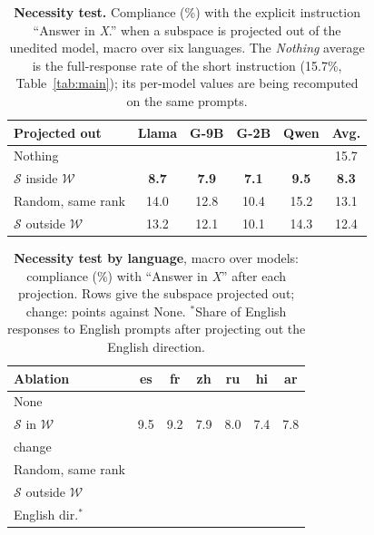 \begin{table}[!htbp]
  \centering
  \footnotesize
  \setlength{\tabcolsep}{3pt}
  \begin{tabular}{@{}lccccc@{}}
    \toprule
    \textbf{Projected out} & \textbf{Llama} & \textbf{G-9B} & \textbf{G-2B} & \textbf{Qwen} & \textbf{Avg.} \\
    \midrule
    Nothing                              & \res{?} & \res{?} & \res{?} & \res{?} & 15.7 \\
    $\mathcal{S}$ inside $\mathcal{W}$   & \textbf{8.7} & \textbf{7.9} & \textbf{7.1} & \textbf{9.5} & \textbf{8.3} \\
    Random, same rank                    & 14.0 & 12.8 & 10.4 & 15.2 & 13.1 \\
    $\mathcal{S}$ outside $\mathcal{W}$  & 13.2 & 12.1 & 10.1 & 14.3 & 12.4 \\
    \bottomrule
  \end{tabular}
  \caption{\textbf{Necessity test.} Compliance (\%) with the explicit instruction ``Answer in \textit{X}.'' when a subspace is projected out of the unedited model, macro over six languages. The \emph{Nothing} average is the \nocue full-response rate of the short instruction (15.7\%, Table~\ref{tab:main}); its per-model values are being recomputed on the same prompts.}
  \label{tab:necessity}
\end{table}

\begin{table}[!htbp]
  \centering
  \footnotesize
  \setlength{\tabcolsep}{2.2pt}
  \begin{tabular}{@{}lcccccc@{}}
    \toprule
    \textbf{Ablation} & es & fr & zh & ru & hi & ar \\
    \midrule
    None                                    & \res{?} & \res{?} & \res{?} & \res{?} & \res{?} & \res{?} \\
    $\mathcal{S}$ in $\mathcal{W}$ & 9.5 & 9.2 & 7.9 & 8.0 & 7.4 & 7.8 \\
    \quad change & \res{?} & \res{?} & \res{?} & \res{?} & \res{?} & \res{?} \\
    Random, same rank & & & & & & \\
    $\mathcal{S}$ outside $\mathcal{W}$      & & & & & & \\
    English dir.$^{*}$ & & & & & & \\
    \bottomrule
  \end{tabular}
  \caption{\textbf{Necessity test by language}, macro over models: compliance (\%) with ``Answer in \textit{X}'' after each projection. Rows give the subspace projected out; change: points against None. $^{*}$Share of English responses to English prompts after projecting out the English direction.}
  \label{tab:app-necessity}
\end{table}

